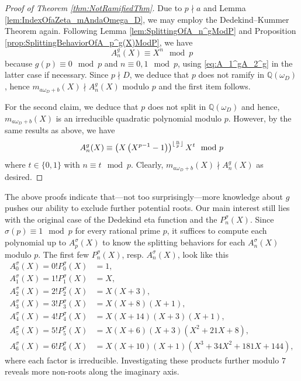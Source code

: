 \documentclass[a4paper, 11pt, reqno]{amsart}
\theoremstyle{plain}
\theoremstyle{definition}
\theoremstyle{remark}
\numberwithin{equation}{section}
\newcommand{\Q}{\mathbb{Q}}
\DeclarePairedDelimiter\floor{\lfloor}{\rfloor}
\begin{document}
\begin{proof}[Proof of Theorem \ref{thm:NotRamifiedThm}]
    Due to $p \nmid a$ and Lemma \ref{lem:IndexOfaZeta_mAndaOmega_D}, we may employ the Dedekind--Kummer Theorem again. Following Lemma \ref{lem:SplittingOfA_n^gModP} and Proposition \ref{prop:SplittingBehaviorOfA_p^g(X)ModP}, we have
    \[A_n^g(X) \equiv X^n \mod p\]
    because $g(p) \equiv 0 \mod p$ and $n \equiv 0, 1 \mod p$, using \eqref{eq:A_1^gA_2^g} in the latter case if necessary. Since $p \nmid D$, we deduce that $p$ does not ramify in $\Q(\omega_D)$, hence $m_{a\omega_D + b}(X) \nmid A_n^g(X)$ modulo $p$ and the first item follows. 

    For the second claim, we deduce that $p$ does not split in $\Q(\omega_D)$ and hence, $m_{a\omega_D + b}(X)$ is an irreducible quadratic polynomial modulo $p$. However, by the same results as above, we have
    \[A_n^g(X) \equiv \left(X\left(X^{p-1} - 1\right)\right)^{\floor{\frac{n}{p}}}X^t \mod p\]
    where $t \in \{0,1\}$ with $n \equiv t \mod p$. Clearly, $m_{a\omega_D + b}(X) \nmid A_n^g(X)$ as desired.
\end{proof}

The above proofs indicate that---not too surprisingly---more knowledge about $g$ pushes our ability to exclude further potential roots. Our main interest still lies with the original case of the Dedekind eta function and the $P_n^\sigma(X)$. Since $\sigma(p) \equiv 1 \mod p$ for every rational prime $p$, it suffices to compute each polynomial up to $A_p^\sigma(X)$ to know the splitting behaviors for each $A_n^\sigma(X)$ modulo $p$. The first few $P_n^\sigma(X)$, resp. $A_n^\sigma(X)$, look like this
\begin{align*}
    A_0^\sigma(X) = 0!P_0^\sigma(X) &= 1,\\
    A_1^\sigma(X) = 1!P_1^\sigma(X) &= X,\\
    A_2^\sigma(X) = 2!P_2^\sigma(X) &= X (X + 3),\\
    A_3^\sigma(X) = 3!P_3^\sigma(X) &= X(X+8)(X+1),\\
    A_4^\sigma(X) = 4!P_4^\sigma(X) &= X (X + 14)(X + 3)(X + 1),\\
    A_5^\sigma(X) = 5!P_5^\sigma(X) &= X (X + 6)(X + 3)(X^2 + 21X + 8),\\
    A_6^\sigma(X) = 6!P_6^\sigma(X) &= X (X + 10)(X + 1)(X^3 + 34X^2 + 181X + 144),
\end{align*}
where each factor is irreducible. Investigating these products further modulo $7$ reveals more non-roots along the imaginary axis.
\end{document}
